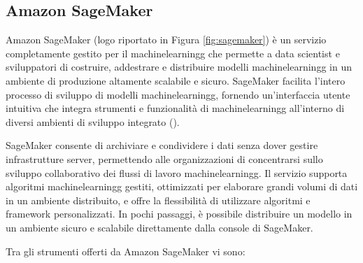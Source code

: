 \subsection{Amazon SageMaker}
Amazon SageMaker (logo riportato in Figura \ref{fig:sagemaker}) è un servizio completamente gestito per il \gls{machinelearningg} che permette a data scientist e sviluppatori di costruire, addestrare e distribuire modelli \gls{machinelearningg} in un ambiente di produzione altamente scalabile e sicuro. SageMaker facilita l'intero processo di sviluppo di modelli \gls{machinelearningg}, fornendo un'interfaccia utente intuitiva che integra strumenti e funzionalità di \gls{machinelearningg} all'interno di diversi ambienti di sviluppo integrato ().

SageMaker consente di archiviare e condividere i dati senza dover gestire infrastrutture server, permettendo alle organizzazioni di concentrarsi sullo sviluppo collaborativo dei flussi di lavoro \gls{machinelearningg}. Il servizio supporta algoritmi \gls{machinelearningg} gestiti, ottimizzati per elaborare grandi volumi di dati in un ambiente distribuito, e offre la flessibilità di utilizzare algoritmi e framework personalizzati. In pochi passaggi, è possibile distribuire un modello in un ambiente sicuro e scalabile direttamente dalla console di SageMaker.

Tra gli strumenti offerti da Amazon SageMaker vi sono:

